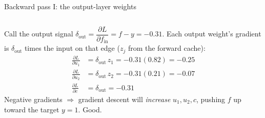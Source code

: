 \documentclass[aspectratio=169]{beamer}
\begin{document}
\begin{frame}{Backward pass I: the output-layer weights}
  \begin{columns}[T]
    Call the output signal $\delta_{\text{out}} = \dfrac{\partial L}{\partial f_{\text{in}}} =
    f - y = -0.31$.
    \vskip 4pt
    Each output weight's gradient is $\delta_{\text{out}}$ times the input on that edge
    ($z_j$ from the forward cache):
    \begin{align*}
      \tfrac{\partial L}{\partial u_1} &= \delta_{\text{out}}\, z_1 = -0.31(0.82) = -0.25\\
      \tfrac{\partial L}{\partial u_2} &= \delta_{\text{out}}\, z_2 = -0.31(0.21) = -0.07\\
      \tfrac{\partial L}{\partial c} &= \delta_{\text{out}} = -0.31
    \end{align*}
    \vskip 4pt
    \footnotesize Negative gradients $\Rightarrow$ gradient descent will \emph{increase}
    $u_1, u_2, c$, pushing $f$ up toward the target $y=1$. Good.
  \end{columns}
\end{frame}
\end{document}
